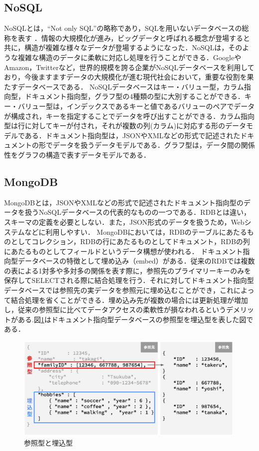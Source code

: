 \documentclass[uplatex]{deimj}
\begin{document}
\subsection{NoSQL}
  NoSQLとは，“Not only SQL”の略称であり，SQLを用いないデータベースの総称を表す \cite{NoSQLBasic}．情報の大規模化が進み，ビッグデータと呼ばれる概念が登場すると共に，構造が複雑な様々なデータが登場するようになった．NoSQLは，そのような複雑な構造のデータに柔軟に対応し処理を行うことができる．GoogleやAmazon，Twitterなど，世界的規模を誇る企業がNoSQLデータベースを利用しており，今後ますますデータの大規模化が進む現代社会において，重要な役割を果たすデータベースである\cite{NoSQLBasic}．
  NoSQLデータベースはキー・バリュー型，カラム指向型，ドキュメント指向型，グラフ型の4種類の型に大別することができる．キー・バリュー型は，インデックスであるキーと値であるバリューのペアでデータが構成され，キーを指定することでデータを呼び出すことができる．カラム指向型は行に対してキーが付され，それが複数の列(カラム)に対応する形のデータモデルである．ドキュメント指向型は，JSONやXMLなどの形式で記述されたドキュメントの形でデータを扱うデータモデルである．グラフ型は，データ間の関係性をグラフの構造で表すデータモデルである\cite{NoSQLBasic}．

\subsection{MongoDB}
  MongoDBとは，JSONやXMLなどの形式で記述されたドキュメント指向型のデータを扱うNoSQLデータベースの代表的なものの一つである．RDBとは違い，スキーマの定義を必要としない\cite{NoSQLBasic}\cite{WhatIsMongoDB}．また，JSON形式のデータを扱うため，Webシステムなどに利用しやすい．
  MongoDBにおいては，RDBのテーブルにあたるものとしてコレクション，RDBの行にあたるものとしてドキュメント，RDBの列にあたるものとしてフィールドというデータ構想が使われる．
  ドキュメント指向型データベースの特徴として埋め込み（embed）がある．従来のRDBでは複数の表による1対多や多対多の関係を表す際に，参照先のプライマリーキーのみを保存してSELECTされる際に結合処理を行う．それに対してドキュメント指向型データベースでは参照先の実データを参照元に埋め込むことができ，これによって結合処理を省くことができる．埋め込み先が複数の場合には更新処理が増加し，従来の参照型に比べてデータアクセスの柔軟性が損なわれるというデメリットがある\cite{MongoDBInAction}.図\ref{EmbedReference}はドキュメント指向型データベースの参照型を埋込型を表した図である．
  \begin{figure}[h]
    \includegraphics[width=30em, trim=0 5em 0 5em]{src/EmbedReference.eps}
    \caption{参照型と埋込型}
    \label{EmbedReference}
  \end{figure}
\end{document}
